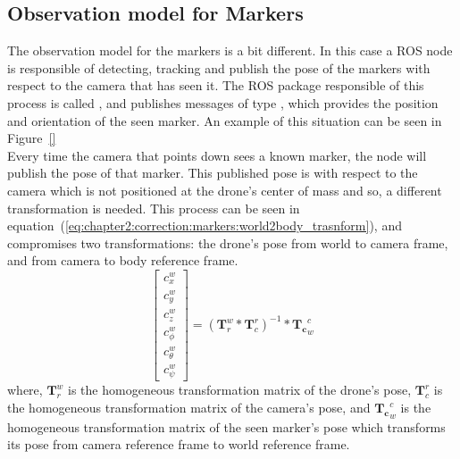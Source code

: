 \subsection{Observation model for Markers}
\label{subsec:chapter2:correction:markers}
The observation model for the markers is a bit different. In this case a ROS node is responsible of detecting, tracking and publish the pose of the markers with respect to the camera that has seen it. The ROS package responsible of this process is called , and publishes messages of type , which provides the position and orientation of the seen marker. An example of this situation can be seen in Figure~\ref{}\\

Every time the camera that points down sees a known marker, the  node will publish the pose of that marker. This published pose is with respect to the camera which is not positioned at the drone's center of mass and so, a different transformation is needed. This process can be seen in equation~(\ref{eq:chapter2:correction:markers:world2body_trasnform}), and compromises two transformations: the drone's pose from world to camera frame, and from camera to body reference frame.
\begin{equation}
    \begin{bmatrix}
        c_x^w \\ c_y^w \\ c_z^w \\ c_{\phi}^w \\ c_{\theta}^w \\ c_{\psi}^w
    \end{bmatrix} = (\textbf{T}_r^w * \textbf{T}_c^r)^{-1} * \mathbf{T_c}_w^c
    \label{eq:chapter2:correction:markers:world2body_trasnform}
\end{equation}
where, $\textbf{T}_r^w$ is the homogeneous transformation matrix of the drone's pose, $\textbf{T}_c^r$ is the homogeneous transformation matrix of the camera's pose, and $\mathbf{T_c}_w^c$ is the homogeneous transformation matrix of the seen marker's pose which transforms its pose from camera reference frame to world reference frame.\\

